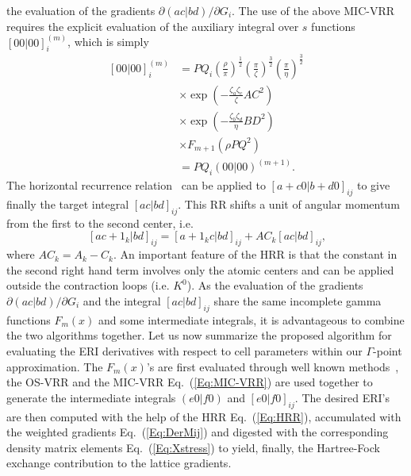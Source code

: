 \documentclass[prl,twocolumn,showpacs,twocolumngrid,superbib]{revtex4}
\begin{document}
the evaluation of the gradients $\partial (ac|bd)/\partial G_i$.
The use of the above MIC-VRR requires the explicit evaluation of the auxiliary integral
over $s$ functions $[00|00]_{i}^{(m)}$, which is simply
\begin{equation*}
  \begin{split}
    [00|00]_{i}^{(m)}&=
    PQ_i \left(\frac{\rho}{\pi}\right)^{\frac{1}{2}}
    \left(\frac{\pi}{\zeta}\right)^{\frac{3}{2}}\left(\frac{\pi}{\eta}\right)^{\frac{3}{2}}\\
    &\times\exp\left(-\frac{\zeta_a\zeta_c}{\zeta}AC^2\right) \\
    &\times\exp\left(-\frac{\zeta_b\zeta_d}{\eta}BD^2\right) \\
    &\times F_{m+1}(\rho PQ^2) \\
    &=PQ_i(00|00)^{(m+1)}.
  \end{split}
\end{equation*}
The horizontal recurrence relation~\cite{MGordon88} can be applied to $[a+c0|b+d0]_{ij}$ to give 
finally the target integral $[ac|bd]_{ij}$.
This RR shifts a unit of angular momentum from the first to the second center, i.e.
\begin{equation}~\label{Eq:HRR}
  [ac+1_k|bd]_{ij}=[a+1_kc|bd]_{ij}+AC_k[ac|bd]_{ij},
\end{equation}
where $AC_k=A_k-C_k$. An important feature of the HRR is that the 
constant in the second right hand term involves only the atomic centers
and can be applied outside the contraction loops (i.e. $K^0$).
As the evaluation of the gradients $\partial (ac|bd)/\partial G_i$ and the integral
$[ac|bd]_{ij}$ share the same incomplete gamma functions 
$F_m(x)$ and some intermediate integrals, it is 
advantageous to combine the two algorithms together.
Let us now summarize the proposed algorithm for evaluating the ERI derivatives
with respect to cell parameters within our $\Gamma$-point approximation.
The $F_m(x)$'s are first evaluated through well known methods~\cite{LMcmurchie78,SObara86},
the OS-VRR and the MIC-VRR Eq.~(\ref{Eq:MIC-VRR}) are used together 
to generate the intermediate integrals $(e0|f0)$ and $[e0|f0]_{ij}$. The
desired ERI's are then computed with the help of the HRR Eq.~(\ref{Eq:HRR}),
accumulated with the weighted gradients Eq.~(\ref{Eq:DerMij}) and digested
with the corresponding density matrix elements Eq.~(\ref{Eq:Xstress}) to
yield, finally, the Hartree-Fock exchange contribution to the lattice gradients.
\end{document}
